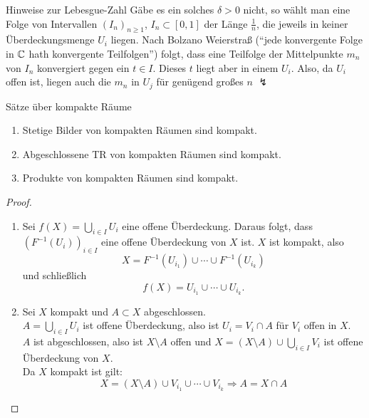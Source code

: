 \begin{remark}{Hinweise zur Lebesgue-Zahl}
  Gäbe es ein solches $ \delta > 0 $ nicht, so wählt man eine Folge von Intervallen $ (I_n)_{n \geq 1} $, $ I_n \subset [0,1] $ der Länge $ \tfrac{1}{n} $, die jeweils in keiner Überdeckungsmenge $ U_i $ liegen. Nach Bolzano Weierstraß (``jede konvergente Folge in $ \mathbb{C} $ hath konvergente Teilfolgen'') folgt, dass eine Teilfolge der Mittelpunkte $ m_n $ von $ I_n $ konvergiert gegen ein $ t \in I $. Dieses $ t $ liegt aber in einem $ U_i $. Also, da $ U_i $ offen ist, liegen auch die $ m_n $ in $ U_j $ für genügend großes $ n $ $ \lightning $
\end{remark}

\begin{theorem}{Sätze über kompakte Räume}
  \begin{enumerate}
    \item Stetige Bilder von kompakten Räumen sind kompakt.
    \item Abgeschlossene TR von kompakten Räumen sind kompakt.
    \item Produkte von kompakten Räumen sind kompakt. 
  \end{enumerate}
  \begin{proof}
    \begin{enumerate}
      \item Sei $ f(X) = \bigcup_{i \in I} U_i $ eine offene Überdeckung. Daraus folgt, dass $ \left( F^{-1}(U_i) \right)_{i \in I} $ eine offene Überdeckung von $ X $ ist. $ X $ ist kompakt, also
      \begin{equation*}
        X = F^{-1}(U_{i_1}) \cup \cdots \cup F^{-1}(U_{i_k})
      \end{equation*}
      und schließlich
      \begin{equation*}
        f(X) = U_{i_1} \cup \cdots \cup U_{i_k}\text{.}
      \end{equation*}
      \item Sei $ X $ kompakt und $ A \subset X $ abgeschlossen. \\
        $ A = \bigcup_{i \in I} U_i $ ist offene Überdeckung, also ist $ U_i = V_i \cap A $ für $ V_i $ offen in $ X $. \\
        $ A $ ist abgeschlossen, also ist $ X \setminus A $ offen und $ X = (X \setminus A) \cup \bigcup_{i \in I} V_i $ ist offene Überdeckung von $ X $. \\
        Da $ X $ kompakt ist gilt:
        \begin{equation*}
          X = (X \setminus A) \cup V_{i_1} \cup \cdots \cup V_{i_k} \Rightarrow A = X \cap A

\end{equation*}
\end{enumerate}
\end{proof}
\end{theorem}
